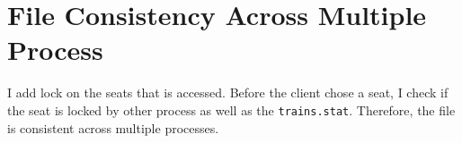 \section{File Consistency Across Multiple Process}

I add lock on the seats that is accessed. Before the client chose a seat, I check if the seat is locked by other process as well as the \verb|trains.stat|. Therefore, the file is consistent across multiple processes.